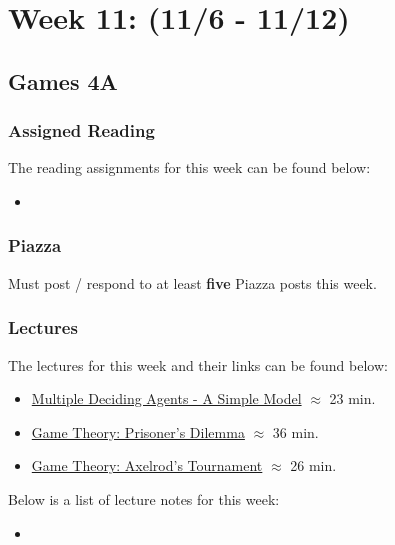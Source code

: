 \clearpage
\chapter{Week 11: (11/6 - 11/12)}

\section{Games 4A}

\subsection{Assigned Reading}

The reading assignments for this week can be found below:

\begin{itemize}
    \item {}
\end{itemize}

\subsection{Piazza}

Must post / respond to at least \textbf{five} Piazza posts this week.  

\subsection{Lectures}

The lectures for this week and their links can be found below:

\begin{itemize}
    \item \href{https://applied.cs.colorado.edu/mod/hvp/view.php?id=49410}{Multiple Deciding Agents - A Simple Model} $\approx$ 23 min.
    \item \href{https://applied.cs.colorado.edu/mod/hvp/view.php?id=49411}{Game Theory: Prisoner's Dilemma} $\approx$ 36 min.
    \item \href{https://applied.cs.colorado.edu/course/view.php?id=236&section=12}{Game Theory: Axelrod's Tournament} $\approx$ 26 min.
\end{itemize}

\noindent Below is a list of lecture notes for this week:

\begin{itemize}
    \item {}
\end{itemize}

